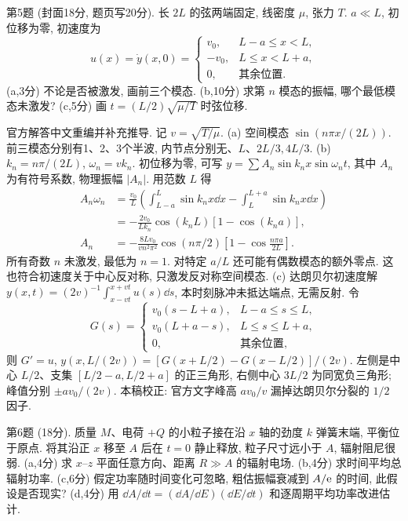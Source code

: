 \begin{exercise}\label{exam:f1.5}
第5题 (封面18分, 题页写20分). 长 $2L$ 的弦两端固定, 线密度 $\mu$, 张力 $T$. $a\ll L$, 初位移为零, 初速度为
\[
u(x)=\dot y(x,0)=\begin{cases}v_0,&L-a\le x<L,\\-v_0,&L\le x<L+a,\\0,&\text{其余位置}.\end{cases}
\]
(a,3分) 不论是否被激发, 画前三个模态. (b,10分) 求第 $n$ 模态的振幅, 哪个最低模态未激发? (c,5分) 画 $t=(L/2)\sqrt{\mu/T}$ 时弦位移.
\end{exercise}
\begin{solution}
官方解答中文重编并补充推导. 记 $v=\sqrt{T/\mu}$. (a) 空间模态 $\sin(n\pi x/(2L))$. 前三模态分别有1、2、3个半波, 内节点分别无、$L$、$2L/3,4L/3$.
(b) $k_n=n\pi/(2L)$, $\omega_n=vk_n$. 初位移为零, 可写 $y=\sum A_n\sin k_nx\sin\omega_nt$, 其中 $A_n$ 为有符号系数, 物理振幅 $|A_n|$. 用范数 $L$ 得
\begin{align*}
A_n\omega_n&=\frac{v_0}{L}\left(\int_{L-a}^{L}\sin k_nx\dd x-\int_L^{L+a}\sin k_nx\dd x\right)\\
&=-\frac{2v_0}{Lk_n}\cos(k_nL)[1-\cos(k_na)],\\
A_n&=-\frac{8Lv_0}{vn^2\pi^2}\cos(n\pi/2)\left[1-\cos\frac{n\pi a}{2L}\right].
\end{align*}
所有奇数 $n$ 未激发, 最低为 $n=1$. 对特定 $a/L$ 还可能有偶数模态的额外零点. 这也符合初速度关于中心反对称, 只激发反对称空间模态.
(c) 达朗贝尔初速度解 $y(x,t)=(2v)^{-1}\int_{x-vt}^{x+vt}u(s)\dd s$, 本时刻脉冲未抵达端点, 无需反射. 令
\[
G(s)=\begin{cases}v_0(s-L+a),&L-a\le s\le L,\\v_0(L+a-s),&L\le s\le L+a,\\0,&\text{其余位置},\end{cases}
\]
则 $G'=u$, $y(x,L/(2v))=[G(x+L/2)-G(x-L/2)]/(2v)$. 左侧是中心 $L/2$、支集 $[L/2-a,L/2+a]$ 的正三角形, 右侧中心 $3L/2$ 为同宽负三角形; 峰值分别 $\pm av_0/(2v)$. 本稿校正: 官方文字峰高 $av_0/v$ 漏掉达朗贝尔分裂的 $1/2$ 因子.
\end{solution}
\begin{exercise}\label{exam:f1.6}
第6题 (18分). 质量 $M$、电荷 $+Q$ 的小粒子接在沿 $x$ 轴的劲度 $k$ 弹簧末端, 平衡位于原点. 将其沿正 $x$ 移至 $A$ 后在 $t=0$ 静止释放, 粒子尺寸远小于 $A$, 辐射阻尼很弱. (a,4分) 求 $x$--$z$ 平面任意方向、距离 $R\gg A$ 的辐射电场. (b,4分) 求时间平均总辐射功率. (c,6分) 假定功率随时间变化可忽略, 粗估振幅衰减到 $A/\mathrm e$ 的时间, 此假设是否现实? (d,4分) 用 $\dd A/\dd t=(\dd A/\dd E)(\dd E/\dd t)$ 和逐周期平均功率改进估计.
\end{exercise}
